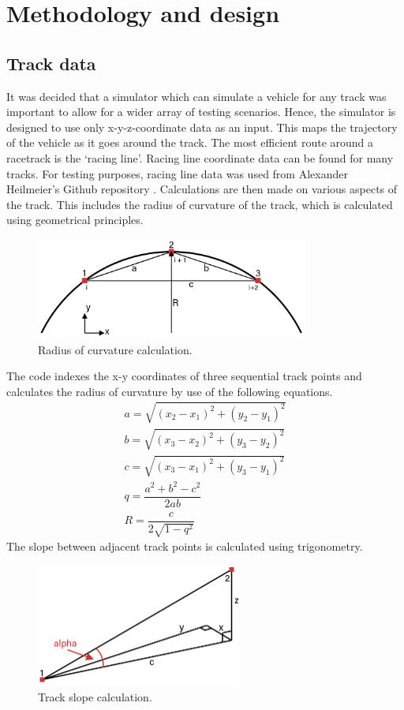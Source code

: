 \documentclass[11pt]{article}
\numberwithin{equation}{section}
\begin{document}
\section{Methodology and design}
\subsection{Track data}
It was decided that a simulator which can simulate a vehicle for any track was important to allow for a wider array of testing scenarios. Hence, the simulator is designed to use only x-y-z-coordinate data as an input. This maps the trajectory of the vehicle as it goes around the track. The most efficient route around a racetrack is the `racing line'. Racing line coordinate data can be found for many tracks. For testing purposes, racing line data was used from Alexander Heilmeier's Github repository \citep{heilmeier_2022}. Calculations are then made on various aspects of the track. This includes the radius of curvature of the track, which is calculated using geometrical principles.
\begin{figure}[H]
    \centering
    \includegraphics[width = 0.8\textwidth]{./img/radiusOfCurvature.png}
    \caption{Radius of curvature calculation.}
\end{figure}
The code indexes the x-y coordinates of three sequential track points and calculates the radius of curvature by use of the following equations.
\begin{gather}
    a = \sqrt{\left(x_2 - x_1\right)^2 + \left(y_2 - y_1\right)^2}\\
    b = \sqrt{\left(x_3 - x_2\right)^2 + \left(y_3 - y_2\right)^2}\\
    c = \sqrt{\left(x_3 - x_1\right)^2 + \left(y_3 - y_1\right)^2}\\
    q = \dfrac{a^2 + b^2 - c^2}{2ab}\\
    R = \dfrac{c}{2\sqrt{1 - q^2}}
\end{gather}
The slope between adjacent track points is calculated using trigonometry.
\begin{figure}[H]
    \centering
    \includegraphics[width = 0.6\textwidth]{./img/trackSlope.png}
    \caption{Track slope calculation.}
\end{figure}
\end{document}
